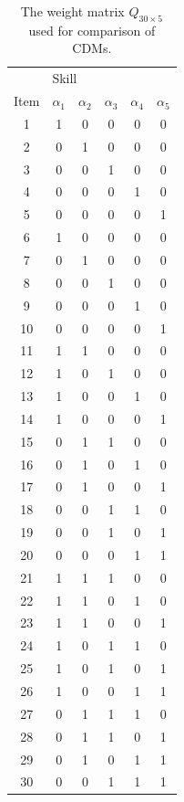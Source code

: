\documentclass[english]{pwr_wmat_praca_dyplomowa}
\theoremstyle{plain}
\theoremstyle{definition}
\numberwithin{theorem}{chapter}
\begin{document}
\begin{table}[H]
	\centering
	\begin{tabular}{c c c c c c} 
		\hline
		{\rule{0pt}{3ex}} & \multicolumn{5}{l}{Skill} \\
		Item & $\alpha_1$ & $\alpha_2$ & $\alpha_3$ &  $\alpha_4$ & $\alpha_5$ \\ [0.5ex] 
		\hline
		1 & 1 & 0 & 0 & 0 & 0 \\ 
		2 & 0 & 1 & 0 & 0 & 0 \\
		3 & 0 & 0 & 1 & 0 & 0 \\
		4 & 0 & 0 & 0 & 1 & 0 \\
		5 & 0 & 0 & 0 & 0 & 1 \\
		6 & 1 & 0 & 0 & 0 & 0 \\ 
		7 & 0 & 1 & 0 & 0 & 0 \\
		8 & 0 & 0 & 1 & 0 & 0 \\
		9 & 0 & 0 & 0 & 1 & 0 \\
		10 & 0 & 0 & 0 & 0 & 1 \\ 
		11 & 1 & 1 & 0 & 0 & 0 \\ 
		12 & 1 & 0 & 1 & 0 & 0 \\
		13 & 1 & 0 & 0 & 1 & 0 \\
		14 & 1 & 0 & 0 & 0 & 1 \\
		15 & 0 & 1 & 1 & 0 & 0 \\
		16 & 0 & 1 & 0 & 1 & 0 \\  
		17 & 0 & 1 & 0 & 0 & 1 \\ 
		18 & 0 & 0 & 1 & 1 & 0 \\
		19 & 0 & 0 & 1 & 0 & 1 \\
		20 & 0 & 0 & 0 & 1 & 1 \\ 
		21 & 1 & 1 & 1 & 0 & 0 \\
		22 & 1 & 1 & 0 & 1 & 0 \\ 
		23 & 1 & 1 & 0 & 0 & 1 \\ 
		24 & 1 & 0 & 1 & 1 & 0 \\
		25 & 1 & 0 & 1 & 0 & 1 \\ 
		26 & 1 & 0 & 0 & 1 & 1 \\ 
		27 & 0 & 1 & 1 & 1 & 0 \\ 
		28 & 0 & 1 & 1 & 0 & 1 \\ 
		29 & 0 & 1 & 0 & 1 & 1 \\ 
		30 & 0 & 0 & 1 & 1 & 1\\ [1ex] 
		\hline
	\end{tabular}
	\caption{The weight matrix $Q_{30 \times 5}$ used for comparison of CDMs.}
	\label{tab:qmatrix_sim} 
\end{table}
\end{document}
